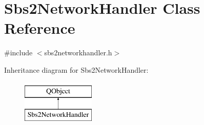 \hypertarget{classSbs2NetworkHandler}{\section{Sbs2\-Network\-Handler Class Reference}
\label{classSbs2NetworkHandler}
}


{\ttfamily \#include $<$sbs2networkhandler.\-h$>$}

Inheritance diagram for Sbs2\-Network\-Handler\-:\begin{figure}[H]
\begin{center}
\leavevmode
\includegraphics[height=2.000000cm]{classSbs2NetworkHandler}
\end{center}
\end{figure}
